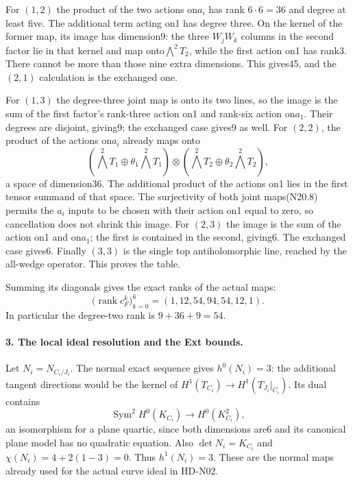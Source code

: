 For $(1,2)$ the product of the two actions on$a_i$ has rank
$6\cdot6=36$ and degree at least five. The additional term
acting on1 has degree three. On the kernel of the former map,
its image has dimension9: the three $W_jW_k$ columns in the
second factor lie in that kernel and map onto$\bigwedge^2T_2$,
while the first action on1 has rank3. There cannot be more
than those nine extra dimensions. This gives45, and the
$(2,1)$ calculation is the exchanged one.

For $(1,3)$ the degree-three joint map is onto its two lines,
so the image is the sum of the first factor's rank-three
action on1 and rank-six action on$a_1$. Their degrees are
disjoint, giving9; the exchanged case gives9 as well.
For $(2,2)$, the product of the actions on$a_i$ already maps
onto
\[
 (\bigwedge^2T_1\oplus\theta_1\bigwedge^2T_1)
 \otimes
 (\bigwedge^2T_2\oplus\theta_2\bigwedge^2T_2),
\]
a space of dimension36. The additional product of the
actions on1 lies in the first tensor summand of that space.
The surjectivity of both joint maps(N20.8) permits the
$a_i$ inputs to be chosen with their action on1 equal to zero,
so cancellation does not shrink this image.
For $(2,3)$ the image is the sum of the action on1 and on$a_1$;
the first is contained in the second, giving6. The exchanged
case gives6. Finally $(3,3)$ is the single top antiholomorphic
line, reached by the all-wedge operator. This proves the table.

Summing its diagonals gives the exact ranks of the actual maps:
\[
        \bigl(\operatorname{rank}c_F^k\bigr)_{k=0}^6
                         =(1,12,54,94,54,12,1).                \tag{N20.10}
\]
In particular the degree-two rank is $9+36+9=54$.

\paragraph{3. The local ideal resolution and the Ext bounds.}
Let $N_i=N_{C_i/J_i}$. The normal exact sequence gives
$h^0(N_i)=3$: the additional tangent directions would be the
kernel of $H^1(T_{C_i})\to H^1(T_{J_i}|_{C_i})$.
Its dual contains
\[
 \operatorname{Sym}^2H^0(K_{C_i})\longrightarrow H^0(K_{C_i}^2),
\]
an isomorphism for a plane quartic, since both dimensions are6
and its canonical plane model has no quadratic equation.
Also $\det N_i=K_{C_i}$ and $\chi(N_i)=4+2(1-3)=0$.
Thus $h^1(N_i)=3$. These are the normal maps already used
for the actual curve ideal in HD-N02.

